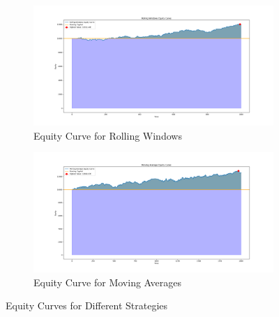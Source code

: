 \documentclass{imc-inf}
\begin{document}
\begin{figure}[h!]
		\begin{subfigure}{0.45\textwidth}
			\centering
			\includegraphics[width=\textwidth]{equity_curve_rolling_windows.png}
			\caption{Equity Curve for Rolling Windows}
			\label{fig:equity_curve_rolling_windows}
		\end{subfigure}
		\hfill
		\begin{subfigure}{0.45\textwidth}
			\centering
			\includegraphics[width=\textwidth]{equity_curve_moving_averages.png}
			\caption{Equity Curve for Moving Averages}
			\label{fig:equity_curve_moving_averages}
		\end{subfigure}
		
		\caption{Equity Curves for Different Strategies}
		\label{fig:combined_equity_curves}
	\end{figure}
	
\end{document}
